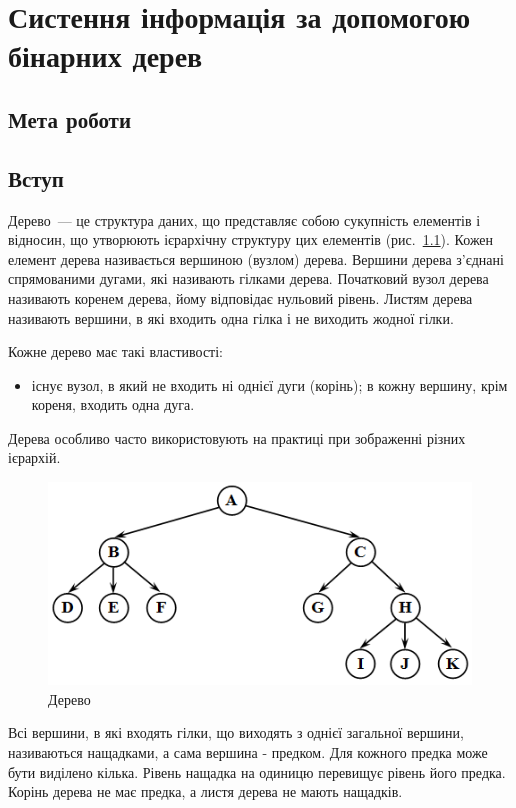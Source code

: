 \chapter{Систення інформація за допомогою бінарних дерев}
\nopagebreak[4]
\section*{Мета роботи}

\nopagebreak[4]
\section{Вступ}
\nopagebreak[4]
Дерево~--- це структура даних, що представляє собою сукупність елементів і відносин, що утворюють ієрархічну структуру цих елементів (рис.~\ref{f:tree1}). Кожен елемент дерева називається вершиною (вузлом) дерева. Вершини дерева з'єднані спрямованими дугами, які називають гілками дерева. Початковий вузол дерева називають коренем дерева, йому відповідає нульовий рівень. Листям дерева називають вершини, в які входить одна гілка і не виходить жодної гілки.

Кожне дерево має такі властивості:
\begin{itemize}
\item існує вузол, в який не входить ні однієї дуги (корінь);
    в кожну вершину, крім кореня, входить одна дуга.
\end{itemize}


Дерева особливо часто використовують на практиці при зображенні різних ієрархій.

\begin{figure}
\caption{Дерево}\label{f:tree1}
\includegraphics[width=13cm]{pic/31_01.png}

\end{figure}


Всі вершини, в які входять гілки, що виходять з однієї загальної вершини, називаються нащадками, а сама вершина - предком. Для кожного предка може бути виділено кілька. Рівень нащадка на одиницю перевищує рівень його предка. Корінь дерева не має предка, а листя дерева не мають нащадків.

